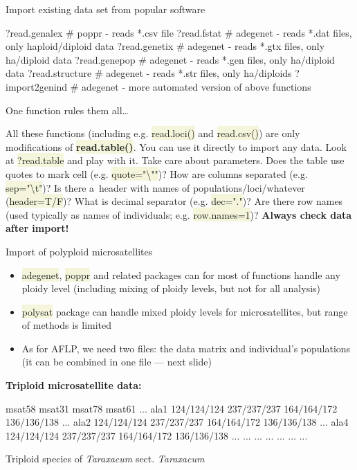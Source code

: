\documentclass[compress, ucs, xelatex, 11pt, xcolor=svgnames, aspectratio=169,
	hyperref={
		bookmarks=true,
		unicode=true,
		colorlinks=true,
		pdftitle={Molecular data in R},
		plainpages=false,
		pdfauthor={Vojtech Zeisek},
		pdfsubject={Course about phylogeny and evolution in R},
		pdfcreator={XeLaTeX},
		pdfkeywords={R, evolution, phylogeny, molecular data},
		linkcolor=Crimson, %
		anchorcolor=Magenta, %
		citecolor=Magenta, %
		filecolor=Magenta, %
		menucolor=Magenta, %
		urlcolor=DodgerBlue, %
		pdftex},
	url={hyphens, lowtilde} %
	]{beamer}
\renewcommand{\texttt}[1]{\colorbox{Beige}{{\ttfamily #1}}}
\begin{document}
\begin{frame}[fragile]{Import existing data set from popular software}
	\begin{spluscode}
    ?read.genalex # poppr - reads *.csv file
    ?read.fstat # adegenet - reads *.dat files, only haploid/diploid data
    ?read.genetix # adegenet - reads *.gtx files, only ha/diploid data
    ?read.genepop # adegenet - reads *.gen files, only ha/diploid data
    ?read.structure # adegenet - reads *.str files, only ha/diploids
    ?import2genind # adegenet - more automated version of above functions
	\end{spluscode}
	\begin{alertblock}{One function rules them all\ldots}
		\begin{footnotesize}
			All these functions (including e.g. \texttt{read.loci()} and \texttt{read.csv()}) are only modifications of \textbf{\texttt{read.table()}}. You can use it directly to import any data. Look at \texttt{?read.table} and play with it. Take care about parameters. Does the table use quotes to mark cell (e.g. \texttt{quote="\textbackslash ""})? How are columns separated (e.g. \texttt{sep="\textbackslash t"})? Is there a~header with names of populations/loci/whatever (\texttt{header=T/F})? What is decimal separator (e.g. \texttt{dec="."})? Are there row names (used typically as names of individuals; e.g. \texttt{row.names=1})? \alert{\textbf{Always check data after import!}}
		\end{footnotesize}
	\end{alertblock}
\end{frame}

\begin{frame}[fragile]{Import of polyploid microsatellites}
	\vfill
	\begin{itemize}
		\item \texttt{adegenet}, \texttt{poppr} and related packages can for most of functions handle any ploidy level (including mixing of ploidy levels, but not for all analysis)
		\item \texttt{polysat} package can handle mixed ploidy levels for microsatellites, but range of methods is limited
		\item As for AFLP, we need two files: the data matrix and individual's populations (it can be combined in one file --- next slide)
	\end{itemize}
	\vfill
	\textbf{Triploid microsatellite data:}
	\vfil
	\begin{spluscode}
              msat58      msat31      msat78      msat61 ...
    ala1 124/124/124 237/237/237 164/164/172 136/136/138 ...
    ala2 124/124/124 237/237/237 164/164/172 136/136/138 ...
    ala4 124/124/124 237/237/237 164/164/172 136/136/138 ...
     ...         ...         ...         ...         ... ...
	\end{spluscode}
	\vfill
	\begin{footnotesize}
		Triploid species of \textit{Taraxacum} sect. \textit{Taraxacum}
	\end{footnotesize}
	\vfill
\end{frame}
\end{document}
